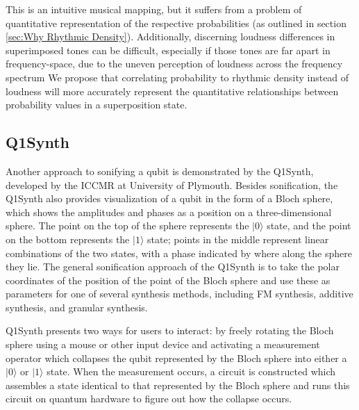 \documentclass[10pt,twocolumn]{article}
\begin{document}
This is an intuitive musical mapping, but it suffers from a problem of quantitative representation of the respective probabilities (as outlined in section \ref{sec:Why Rhythmic Density}). Additionally, discerning loudness differences in superimposed tones can be difficult, especially if those tones are far apart in frequency-space, due to the uneven perception of loudness across the frequency spectrum\cite{smyth2019} We propose that correlating probability to rhythmic density instead of loudness will more accurately represent the quantitative relationships between probability values in a superposition state.

\subsection{Q1Synth}

Another approach to sonifying a qubit is demonstrated by the Q1Synth\cite{q1synth}, developed by the ICCMR at University of Plymouth. Besides sonification, the Q1Synth also provides visualization of a qubit in the form of a Bloch sphere, which shows the amplitudes and phases as a position on a three-dimensional sphere. The point on the top of the sphere represents the $|0\rangle$ state, and the point on the bottom represents the $|1\rangle$ state; points in the middle represent linear combinations of the two states, with a phase indicated by where along the sphere they lie. The general sonification approach of the Q1Synth is to take the polar coordinates of the position of the point of the Bloch sphere and use these as parameters for one of several synthesis methods, including FM synthesis, additive synthesis, and granular synthesis.

Q1Synth presents two ways for users to interact: by freely rotating the Bloch sphere using a mouse or other input device and activating a measurement operator which collapses the qubit represented by the Bloch sphere into either a $|0\rangle$ or $|1\rangle$ state. When the measurement occurs, a circuit is constructed which assembles a state identical to that represented by the Bloch sphere and runs this circuit on quantum hardware to figure out how the collapse occurs.
\end{document}
